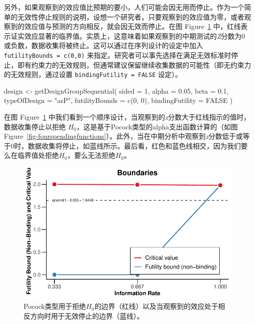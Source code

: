 \documentclass[
  letterpaper,
  DIV=11,
  numbers=noendperiod]{scrreprt}
\newenvironment{Shaded}{\begin{snugshade}}{\end{snugshade}}
\newcommand{\AttributeTok}[1]{\textcolor[rgb]{0.40,0.45,0.13}{#1}}
\newcommand{\ConstantTok}[1]{\textcolor[rgb]{0.56,0.35,0.01}{#1}}
\newcommand{\DecValTok}[1]{\textcolor[rgb]{0.68,0.00,0.00}{#1}}
\newcommand{\FloatTok}[1]{\textcolor[rgb]{0.68,0.00,0.00}{#1}}
\newcommand{\FunctionTok}[1]{\textcolor[rgb]{0.28,0.35,0.67}{#1}}
\newcommand{\NormalTok}[1]{\textcolor[rgb]{0.00,0.23,0.31}{#1}}
\newcommand{\OtherTok}[1]{\textcolor[rgb]{0.00,0.23,0.31}{#1}}
\newcommand{\StringTok}[1]{\textcolor[rgb]{0.13,0.47,0.30}{#1}}
\begin{document}
另外，如果观察到的效应值比预期的要小，人们可能会因无用而停止。作为一个简单的无效性停止规则的说明，设想一个研究者，只要观察到的效应值为零，或者观察到的效应值与预测的方向相反，就会因无效而停止。在图
Figure~\ref{fig-futility1}
中，红线表示证实效应显著的临界值。实质上，这意味着如果观察到的中期测试的\emph{Z}分数为0或负数，数据收集将被终止。这可以通过在序列设计的设定中加入
\texttt{futilityBounds\ =\ c(0,0)}
来指定。研究者可以事先选择在满足无效标准时停止，即有约束力的无效规则，但通常建议保留继续收集数据的可能性（即无约束力的无效规则，通过设置
\texttt{bindingFutility\ =\ FALSE} 设定）。

\begin{Shaded}
\begin{Highlighting}[]
\NormalTok{design }\OtherTok{\textless{}{-}} \FunctionTok{getDesignGroupSequential}\NormalTok{(}
  \AttributeTok{sided =} \DecValTok{1}\NormalTok{,}
  \AttributeTok{alpha =} \FloatTok{0.05}\NormalTok{,}
  \AttributeTok{beta =} \FloatTok{0.1}\NormalTok{,}
  \AttributeTok{typeOfDesign =} \StringTok{"asP"}\NormalTok{,}
  \AttributeTok{futilityBounds =} \FunctionTok{c}\NormalTok{(}\DecValTok{0}\NormalTok{, }\DecValTok{0}\NormalTok{),}
  \AttributeTok{bindingFutility =} \ConstantTok{FALSE}
\NormalTok{)}
\end{Highlighting}
\end{Shaded}

在图 Figure~\ref{fig-futility1}
中我们看到一个顺序设计，当观察到的\emph{z}分数大于红线指示的值时，数据收集停止以拒绝
\(H_0\)，这是基于Pocock类型的alpha支出函数计算的（如图
Figure~\ref{fig-fourspendingfunctions}）。此外，当在中期分析中观察到\emph{z}分数低于或等于0时，数据收集将停止，如蓝线所示。最后看，红色和蓝色线相交，因为我们要么在临界值处拒绝\(H_0\)，要么无法拒绝\(H_0\)。

\begin{figure}

{\centering \includegraphics[width=1\textwidth,height=\textheight]{10-sequential_files/figure-pdf/fig-futility1-1.pdf}

}

\caption{\label{fig-futility1}Pocock类型用于拒绝\(H_0\)的边界（红线）以及当观察到的效应处于相反方向时用于无效停止的边界（蓝线）。}

\end{figure}
\end{document}
